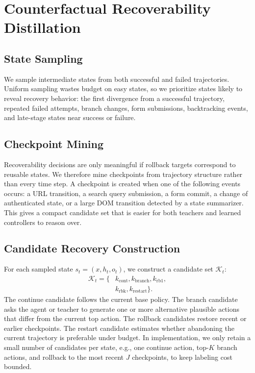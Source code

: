 \documentclass[11pt]{article}
\begin{document}
\section{Counterfactual Recoverability Distillation}
\subsection{State Sampling}
We sample intermediate states from both successful and failed trajectories. Uniform sampling wastes budget on easy states, so we prioritize states likely to reveal recovery behavior: the first divergence from a successful trajectory, repeated failed attempts, branch changes, form submissions, backtracking events, and late-stage states near success or failure.

\subsection{Checkpoint Mining}
Recoverability decisions are only meaningful if rollback targets correspond to reusable states. We therefore mine checkpoints from trajectory structure rather than every time step. A checkpoint is created when one of the following events occurs: a URL transition, a search query submission, a form commit, a change of authenticated state, or a large DOM transition detected by a state summarizer. This gives a compact candidate set that is easier for both teachers and learned controllers to reason over.

\subsection{Candidate Recovery Construction}
For each sampled state $s_t=(x,h_t,o_t)$, we construct a candidate set $\mathcal{K}_t$:
\begin{align}
\mathcal{K}_t = \{&k_{\mathrm{cont}}, k_{\mathrm{branch}}, k_{\mathrm{rb1}}, \\
&k_{\mathrm{rbk}}, k_{\mathrm{restart}}\}.
\end{align}
The continue candidate follows the current base policy. The branch candidate asks the agent or teacher to generate one or more alternative plausible actions that differ from the current top action. The rollback candidates restore recent or earlier checkpoints. The restart candidate estimates whether abandoning the current trajectory is preferable under budget. In implementation, we only retain a small number of candidates per state, e.g., one continue action, top-$K$ branch actions, and rollback to the most recent $J$ checkpoints, to keep labeling cost bounded.
\end{document}
